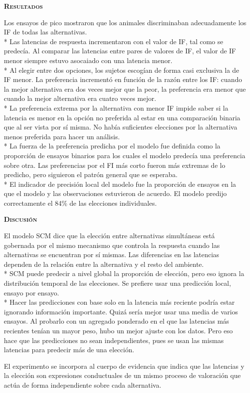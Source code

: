 \documentclass[a4paper,12pt]{article}
\begin{document}
{\scshape\bfseries Resultados}

Los ensayos de pico mostraron que los animales discriminaban adecuadamente los IF de todas las alternativas.\\*
Las latencias de respuesta incrementaron con el valor de IF, tal como se predecía. Al comparar las latencias entre pares de valores de IF, el valor de IF menor siempre estuvo asocaiado con una latencia menor.\\*
Al elegir entre dos opciones, los sujetos escogían de forma casi exclusiva la de IF menor. La preferencia incrementó en función de la razón entre los IF: cuando la mejor alternativa era dos veces mejor que la peor, la preferencia era menor que cuando la mejor alternativa era cuatro veces mejor.\\*
La preferencia extrema por la alternativa con menor IF impide saber si la latencia es menor en la opción no preferida al estar en una comparación binaria que al ser vista por sí misma. No había suficientes elecciones por la alternativa menos preferida para hacer un análisis.\\*
La fuerza de la preferencia predicha por el modelo fue definida como la proporción de ensayos binarios para los cuales el modelo predecía una preferencia sobre otra. Las preferencias por el FI más corto fueron más extremas de lo predicho, pero siguieron el patrón general que se esperaba.\\*
El indicador de precisión local del modelo fue la proporción de ensayos  en la que el modelo y las observaciones estuvieron de acuerdo. El modelo predijo correctamente el 84\% de las elecciones individuales.

{\scshape\bfseries Discusión}

El modelo SCM dice que la elección entre alternativas simultáneas está gobernada por el mismo mecanismo que controla la respuesta cuando las alternativas se encuentran por sí mismas. Las diferencias en las latencias dependen de la relación entre la alternativa y el resto del ambiente.\\*
SCM puede predecir a nivel global la proporción de elección, pero eso ignora la distribución temporal de las elecciones. Se prefiere usar una predicción local, ensayo por ensayo.\\*
Hacer las predicciones con base solo en la latencia más reciente podría estar ignorando información importante. Quizá sería mejor usar una media de varios ensayos. Al probarlo con un agregado ponderado en el que las latencias más recientes tenían un mayor peso, hubo un mejor ajuste con los datos. Pero eso hace que las predicciones no sean independientes, pues se usan las mismas latencias para predecir más de una elección.

El experimento se incorpora al cuerpo de evidencia que indica que las latencias y la elección son expresiones conductuales de un mismo proceso de valoración que actúa de forma independiente sobre cada alternativa.

\end{document}
